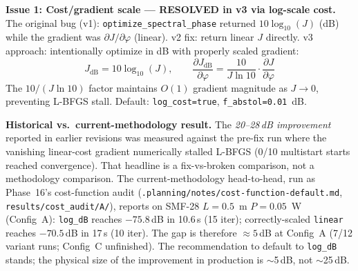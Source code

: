 \documentclass[12pt,a4paper]{article}
\newcommand{\pdv}[2]{\frac{\partial #1}{\partial #2}}
\theoremstyle{definition}
\begin{document}
\begin{verified}
\textbf{Issue 1: Cost/gradient scale --- RESOLVED in v3 via log-scale cost.} The original bug (v1): \texttt{optimize\_spectral\_phase} returned $10\log_{10}(J)$ (dB) while the gradient was $\partial J/\partial\varphi$ (linear). v2 fix: return linear $J$ directly. v3 approach: intentionally optimize in dB with properly scaled gradient:
\begin{equation}
J_{\text{dB}} = 10\log_{10}(J), \qquad \pdv{J_{\text{dB}}}{\varphi} = \frac{10}{J\ln 10}\cdot\pdv{J}{\varphi}
\end{equation}
The $10/(J\ln 10)$ factor maintains $O(1)$ gradient magnitude as $J \to 0$, preventing L-BFGS stall. Default: \texttt{log\_cost=true}, \texttt{f\_abstol=0.01}~dB.

\textbf{Historical vs.\ current-methodology result.} The \emph{20--28\,dB
improvement} reported in earlier revisions was measured against the pre-fix
run where the vanishing linear-cost gradient numerically stalled L-BFGS (0/10
multistart starts reached convergence). That headline is a fix-vs-broken
comparison, not a methodology comparison. The current-methodology head-to-head,
run as Phase~16's cost-function audit (\texttt{.planning/notes/cost-function-default.md},
\texttt{results/cost\_audit/A/}), reports on SMF-28 $L=0.5$~m $P=0.05$~W (Config~A):
\texttt{log\_dB} reaches $-75.8$\,dB in 10.6\,s (15 iter); correctly-scaled
\texttt{linear} reaches $-70.5$\,dB in 17\,s (10 iter). The gap is therefore
$\approx 5$\,dB at Config~A (7/12 variant runs; Config~C unfinished). The
recommendation to default to \texttt{log\_dB} stands; the physical size of
the improvement in production is $\sim$5\,dB, not $\sim$25\,dB.
\end{verified}
\end{document}
